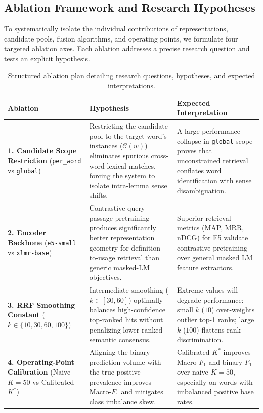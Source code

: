 \subsection{Ablation Framework and Research Hypotheses}
To systematically isolate the individual contributions of representations, candidate pools, fusion algorithms, and operating points, we formulate four targeted ablation axes. Each ablation addresses a precise research question and tests an explicit hypothesis.

\begin{table}[H]
\centering
\small
\begin{tabular}{p{4.2cm}p{5.4cm}p{5.0cm}}
\toprule
\textbf{Ablation} & \textbf{Hypothesis} & \textbf{Expected Interpretation} \\
\midrule
\textbf{1. Candidate Scope Restriction} (\texttt{per\_word} vs \texttt{global}) & Restricting the candidate pool to the target word's instances ($\mathcal{C}(w)$) eliminates spurious cross-word lexical matches, forcing the system to isolate intra-lemma sense shifts. & A large performance collapse in \texttt{global} scope proves that unconstrained retrieval conflates word identification with sense disambiguation. \\
\addlinespace
\textbf{2. Encoder Backbone} (\texttt{e5-small} vs \texttt{xlmr-base}) & Contrastive query-passage pretraining produces significantly better representation geometry for definition-to-usage retrieval than generic masked-LM objectives. & Superior retrieval metrics (MAP, MRR, nDCG) for E5 validate contrastive pretraining over general masked LM feature extractors. \\
\addlinespace
\textbf{3. RRF Smoothing Constant} ($k \in \{10, 30, 60, 100\}$) & Intermediate smoothing ($k \in [30, 60]$) optimally balances high-confidence top-ranked hits without penalizing lower-ranked semantic consensus. & Extreme values will degrade performance: small $k$ ($10$) over-weights outlier top-1 ranks; large $k$ ($100$) flattens rank discrimination. \\
\addlinespace
\textbf{4. Operating-Point Calibration} (Naive $K=50$ vs Calibrated $K^*$) & Aligning the binary prediction volume with the true positive prevalence improves Macro-$F_1$ and mitigates class imbalance skew. & Calibrated $K^*$ improves Macro-$F_1$ and binary $F_1$ over naive $K=50$, especially on words with imbalanced positive base rates. \\
\bottomrule
\end{tabular}
\caption{Structured ablation plan detailing research questions, hypotheses, and expected interpretations.}
\label{tab:ablation_plan}
\end{table}

